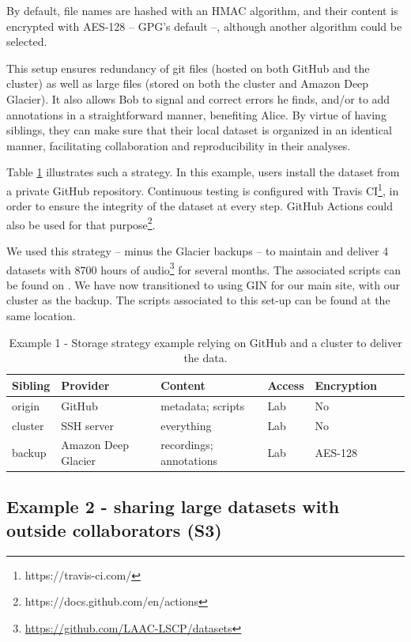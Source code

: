 \documentclass[smallextended]{svjour3}       %
\begin{document}
By default, file names are hashed with an HMAC algorithm, and their content is encrypted with AES-128 -- GPG's default --, although another algorithm could be selected.

This setup ensures redundancy of git files (hosted on both GitHub and the cluster) as well as large files (stored on both the cluster and Amazon Deep Glacier). It also allows Bob to signal and correct errors he finds, and/or to add annotations in a straightforward manner, benefiting Alice. By virtue of having siblings, they can make sure that their local dataset is organized in an identical manner, facilitating collaboration and reproducibility in their analyses.

Table \ref{table:storage1} illustrates such a strategy. In this example, users install the dataset from a private GitHub repository. Continuous testing is configured with Travis CI\footnote{https://travis-ci.com/}, in order to ensure the integrity of the dataset at every step. GitHub Actions could also be used for that purpose\footnote{https://docs.github.com/en/actions}.

We used this strategy -- minus the Glacier backups -- to maintain and deliver 4 datasets with 8700 hours of audio\footnote{\url{https://github.com/LAAC-LSCP/datasets}} for several months. The associated scripts can be found on \cite{datalad_procedures}. We have now transitioned to using GIN for our main site, with our cluster as the backup. The scripts associated to this set-up can be found at the same location.


\begin{table}[!htbp]
\centering
\begin{tabular}{@{}lllllll@{}}
\toprule
\textbf{Sibling} & \textbf{Provider} & \textbf{Content} & \textbf{Access} & \textbf{Encryption} \\ \midrule
origin   & GitHub     & metadata; scripts & Lab & No  \\
cluster  & SSH server & everything & Lab & No  \\
backup & Amazon Deep Glacier  &  recordings; annotations  & Lab            & AES-128 \\ \bottomrule
\end{tabular}
\caption{\label{table:storage1}Example 1 - Storage strategy example relying on GitHub and a cluster to deliver the data.}
\end{table}

\subsection{Example 2 - sharing large datasets with outside collaborators (S3)}
\end{document}
